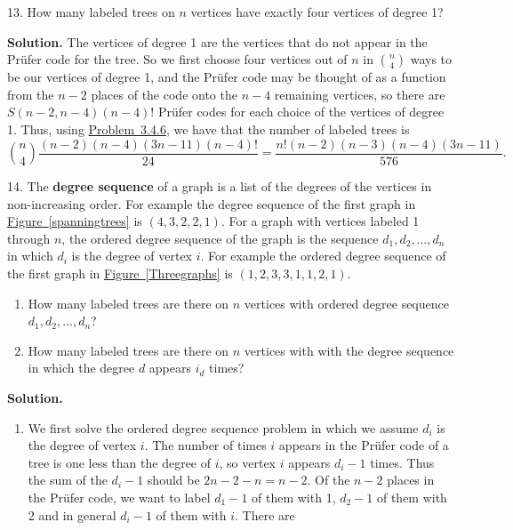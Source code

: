 \documentclass[10pt,]{book}
\newcommand{\terminology}[1]{\textbf{#1}}
\theoremstyle{plain}
\theoremstyle{definition}
\theoremstyle{definition}
\numberwithin{equation}{chapter}
\begin{document}
\begin{exerciselist}
\item[13.]\hypertarget{exercise-35}{}How many labeled trees on \(n\) vertices have exactly four vertices of degree 1?%
\par\smallskip
\par\smallskip
\noindent\textbf{Solution.}\hypertarget{solution-281}{}\quad
The vertices of degree 1 are the vertices that do not appear in the Prüfer code for the tree. So we first choose four vertices out of \(n\) in \(\binom{n}{4}\) ways to be our vertices of degree 1, and the Prüfer code may be thought of as a function from the \(n-2\) places of the code onto the \(n-4\) remaining vertices, so there are \(S(n-2,n-4)(n-4)!\) Prüfer codes for each choice of the vertices of degree 1. Thus, using \hyperlink{partitions-k-2-parts}{Problem~3.4.6}, we have that the number of labeled trees is%
\begin{equation*}
\binom{n}{4}\frac{(n-2)(n-4)(3n-11)(n-4)!}{24} = \frac{n!(n-2)(n-3)(n-4)(3n-11)}{576}\text{.}
\end{equation*}
%
\item[14.]\hypertarget{exercise-36}{}The \terminology{degree sequence} of a graph is a list of the degrees of the vertices in non-increasing order. For example the degree sequence of the first graph in \hyperref[spanningtrees]{Figure~\ref{spanningtrees}} is \((4, 3, 2, 2, 1)\). For a graph with vertices labeled 1 through \(n\), the ordered degree sequence of the graph is the sequence \(d_1, d_2,\dots, d_n\) in which \(d_i\) is the degree of vertex \(i\). For example the ordered degree sequence of the first graph in \hyperref[Threegraphs]{Figure~\ref{Threegraphs}} is \((1,2,3,3,1,1,2,1)\).%
\par
\leavevmode%
\begin{enumerate}[label=(\alph*)]
\item\hypertarget{li-70}{}How many labeled trees are there on \(n\) vertices with ordered degree sequence \(d_1, d_2, \dots, d_n\)?%
\item\hypertarget{li-71}{}How many labeled trees are there on \(n\) vertices with with the degree sequence in which the degree \(d\) appears \(i_d\) times?%
\end{enumerate}
%
\par\smallskip
\par\smallskip
\noindent\textbf{Solution.}\hypertarget{solution-282}{}\quad
\leavevmode%
\begin{enumerate}[label=(\alph*)]
\item\hypertarget{li-72}{}We first solve the ordered degree sequence problem in which we assume \(d_i\) is the degree of vertex \(i\). The number of times \(i\) appears in the Prüfer code of a tree is one less than the degree of \(i\), so vertex \(i\) appears \(d_i - 1\) times. Thus the sum of the \(d_i -1\) should be \(2n-2-n = n-2\). Of the \(n-2\) places in the Prüfer code, we want to label \(d_1 -1\) of them with 1, \(d_2 -1\) of them with 2 and in general \(d_i - 1\) of them with \(i\). There are%

\end{enumerate}
\end{exerciselist}
\end{document}
